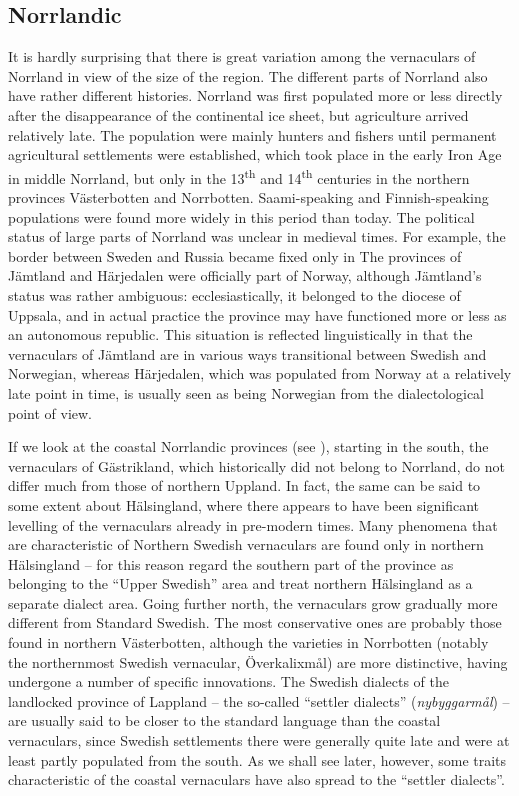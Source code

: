 \subsection{ Norrlandic}

It is hardly surprising that there is great variation among the vernaculars of Norrland in view of the size of the region. The different parts of Norrland also have rather different histories. Norrland was first populated more or less directly after the disappearance of the continental ice sheet, but agriculture arrived relatively late. The population were mainly hunters and fishers until permanent agricultural settlements were established, which took place in the early Iron Age in middle Norrland, but only in the 13\textsuperscript{th} and 14\textsuperscript{th} centuries in the northern provinces Västerbotten and Norrbotten. Saami-speaking and Finnish-speaking populations were found more widely in this period than today. The political status of large parts of Norrland was unclear in medieval times. For example, the border between Sweden and Russia became fixed only in  The provinces of Jämtland and Härjedalen were officially part of Norway, although Jämtland’s status was rather ambiguous: ecclesiastically, it belonged to the diocese of Uppsala, and in actual practice the province may have functioned more or less as an autonomous republic. This situation is reflected linguistically in that the vernaculars of Jämtland are in various ways transitional between Swedish and Norwegian, whereas Härjedalen, which was populated from Norway at a relatively late point in time, is usually seen as being Norwegian from the dialectological point of view.

If we look at the coastal Norrlandic provinces (see ), starting in the south, the vernaculars of Gästrikland, which historically did not belong to Norrland, do not differ much from those of northern Uppland. In fact, the same can be said to some extent about Hälsingland, where there appears to have been significant levelling of the vernaculars already in pre-modern times. Many phenomena that are characteristic of Northern Swedish vernaculars are found only in northern Hälsingland – for this reason \citet[230]{ÅgrenEtAl1954} regard the southern part of the province as belonging to the “Upper Swedish” area and treat northern Hälsingland as a separate dialect area. Going further north, the vernaculars grow gradually more different from Standard Swedish. The most conservative ones are probably those found in northern Västerbotten, although the varieties in Norrbotten (notably the northernmost Swedish vernacular, Överkalixmål) are more distinctive, having undergone a number of specific innovations. The Swedish dialects of the landlocked province of Lappland – the so-called “settler dialects” (\textit{nybyggarmål}) – are usually said to be closer to the standard language than the coastal vernaculars, since Swedish settlements there were generally quite late and were at least partly populated from the south. As we shall see later, however, some traits characteristic of the coastal vernaculars have also spread to the “settler dialects”. 

